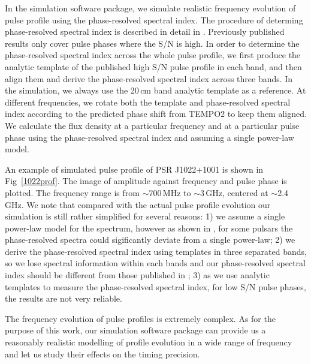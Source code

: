 \documentclass[useAMS,usenatbib]{mn2e}
\begin{document}
In the simulation software package, we simulate realistic frequency evolution of pulse profile
using the phase-resolved spectral index. The procedure of determing phase-resolved 
spectral index is described in detail in \citet{Dai15}. Previously published results only 
cover pulse phases where the S/N is high. In order to determine the phase-resolved spectral 
index across the whole pulse profile, we first produce the analytic template of the published 
high S/N pulse profile in each band, and then align them and derive the phase-resolved spectral 
index across three bands. In the simulation, we always use the 20\,cm band analytic template as 
a reference. At different frequencies, we rotate both the template and phase-resolved spectral 
index according to the predicted phase shift from TEMPO2 to keep them aligned. We calculate the 
flux density at a particular frequency and at a particular pulse phase using the phase-resolved 
spectral index and assuming a single power-law model. 

An example of simulated pulse profile of PSR J1022$+$1001 is shown in Fig~\ref{1022prof}. 
The image of amplitude against frequency and pulse phase is plotted. The frequency range is 
from $\sim$700\,MHz to $\sim$3\,GHz, centered at $\sim$2.4\,GHz. We note that compared with 
the actual pulse profile evolution our simulation is still rather simplified for several
reasons: 1) we assume a single power-law model for the spectrum, however as shown in \citet{Dai15}, 
for some pulsars the phase-resolved spectra could sigificantly deviate from a single 
power-law; 2) we derive the phase-resolved spectral index using templates in three separated 
bands, so we lose spectral information within each bands and our phase-resolved 
spectral index should be different from those published in \citet{Dai15}; 3) as we use 
analytic templates to measure the phase-resolved spectral index, for low S/N pulse 
phases, the results are not very reliable. 

The frequency evolution of pulse profiles is extremely complex. As for the purpose of 
this work, our simulation software package can provide us a reasonably realistic modelling 
of profile evolution in a wide range of frequency and let us study 
their effects on the timing precision.
\end{document}
